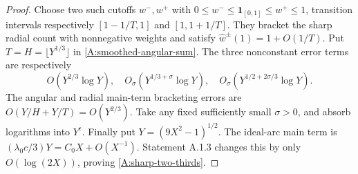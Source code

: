 \begin{proof}
Choose two such cutoffs $w^-,w^+$ with
$0\leq w^-\leq\mathbf1_{[0,1]}\leq w^+\leq1$,
transition intervals respectively $[1-1/T,1]$ and $[1,1+1/T]$.
They bracket the sharp radial count with nonnegative weights and
satisfy $\widehat w^\pm(1)=1+O(1/T)$.
Put $T=H=\lfloor Y^{1/3}\rfloor$ in
\eqref{A:smoothed-angular-sum}. The three nonconstant error terms
are respectively
\[
 O(Y^{2/3}\log Y),\quad
 O_\sigma(Y^{1/3+\sigma}\log Y),\quad
 O_\sigma(Y^{1/2+2\sigma/3}\log Y).
\]
The angular and radial main-term bracketing errors are
$O(Y/H+Y/T)=O(Y^{2/3})$.
Take any fixed sufficiently small $\sigma>0$, and absorb logarithms
into $Y^\epsilon$. Finally put $Y=(9X^2-1)^{1/2}$.
The ideal-arc main term is $(\lambda_0c/3)Y=C_0X+O(X^{-1})$.
Statement A.1.3 changes this by only $O(\log(2X))$, proving
\eqref{A:sharp-two-thirds}.
\end{proof}
